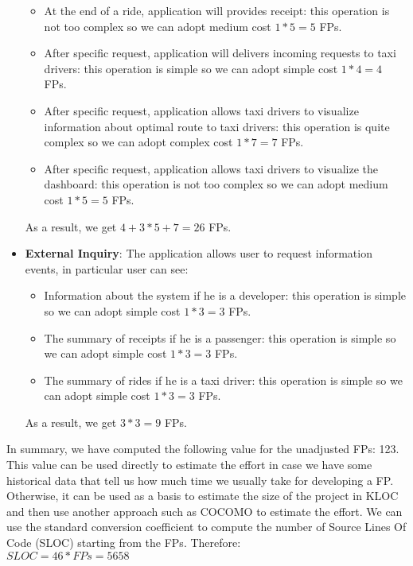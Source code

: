 \begin{itemize}
\begin{itemize}
		\item At the end of a ride, application will provides receipt: this operation is not too complex so we can adopt medium cost $1*5 = 5$ FPs.
		\item After specific request, application will delivers incoming requests to taxi drivers: this operation is simple so we can adopt simple cost $1*4 = 4$ FPs.
		\item After specific request, application allows taxi drivers to visualize information about optimal route to taxi drivers: this operation is quite complex so we can adopt complex cost $1*7 = 7$ FPs.
		\item After specific request, application allows taxi drivers to visualize the dashboard: this operation is not too complex so we can adopt medium cost $1*5 = 5$ FPs.
	\end{itemize}
	As a result, we get $4 + 3*5 + 7 = 26$ FPs.
	\item \textbf{External Inquiry}: The application allows user to request information events, in particular user can see:
	\begin{itemize}
		\item Information about the system if he is a developer: this operation is simple so we can adopt simple cost $1*3 = 3$ FPs.
		\item The summary of receipts if he is a passenger: this operation is simple so we can adopt simple cost $1*3 = 3$ FPs.
		\item The summary of rides if he is a taxi driver: this operation is simple so we can adopt simple cost $1*3 = 3$ FPs.
	\end{itemize}
	As a result, we get $3*3 = 9$ FPs.
\end{itemize}

\noindent In summary, we have computed the following value for the unadjusted FPs: 123. This value can be used directly to estimate the effort in case we have some historical data that tell us how much time we usually take for developing a FP. Otherwise, it can be used as a basis to estimate the size of the project in KLOC and then use another approach such as COCOMO to estimate the effort.
We can use the standard conversion coefficient to compute the number of Source Lines Of Code (SLOC) starting from the FPs. Therefore:\\
$SLOC = 46 * FPs = 5658$